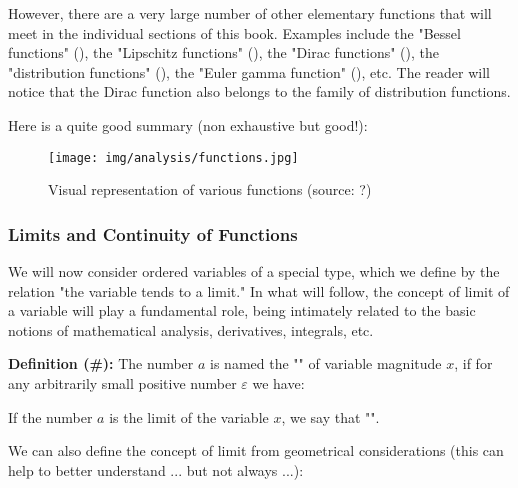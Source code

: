 \begin{enumerate}
		However, there are a very large number of other elementary functions that will meet in the individual sections of this book. Examples include the "Bessel functions" (), the "Lipschitz functions" (), the "Dirac functions" (), the "distribution functions" (), the "Euler gamma function" (), etc. The reader will notice that the Dirac function also belongs to the family of distribution functions.
	\end{enumerate}
	
	Here is a quite good summary (non exhaustive but good!):
	\begin{figure}[H]
		\centering
		\texttt{[image: img/analysis/functions.jpg]}
		\caption[Visual representation of various functions]{Visual representation of various functions (source: ?)}
	\end{figure}
	
	\subsubsection{Limits and Continuity of Functions}\label{limits}
	We will now consider ordered variables of a special type, which we define by the relation "the variable tends to a limit." In what will follow, the concept of limit of a variable will play a fundamental role, being intimately related to the basic notions of mathematical analysis, derivatives, integrals, etc.
	
	\textbf{Definition (\#\mydef):} The number $a$ is named the "" of variable magnitude $x$, if for any arbitrarily small positive number $\varepsilon$ we have:
	
	If the number $a$ is the limit of the variable $x$, we say that "".

	We can also define the concept of limit from geometrical considerations (this can help to better understand ... but not always ...):
	
